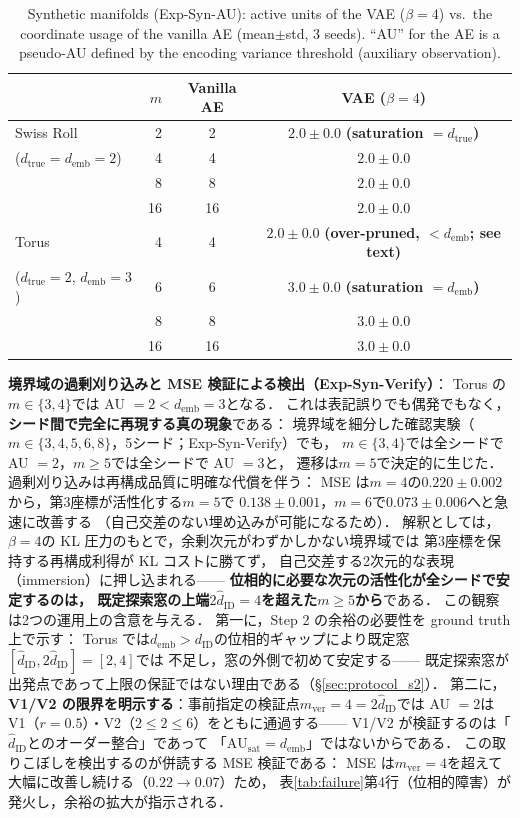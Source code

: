 \documentclass[11pt,a4paper]{jsarticle}
\newcommand{\dID}{d_{\mathrm{ID}}}
\newcommand{\hatdID}{\hat{d}_{\mathrm{ID}}}
\newcommand{\dtrue}{d_{\mathrm{true}}}
\newcommand{\AUsat}{\mathrm{AU}_{\mathrm{sat}}}
\newcommand{\demb}{d_{\mathrm{emb}}}
\begin{document}
\begin{table}[H]
\centering
\caption{Synthetic manifolds (Exp-Syn-AU): active units of the VAE
($\beta = 4$) vs.\ the coordinate usage of the vanilla AE
(mean$\pm$std, 3 seeds). ``AU'' for the AE is a pseudo-AU defined by the
encoding variance threshold (auxiliary observation).}
\label{tab:ea}
\small
\begin{tabular}{lrcc}
\toprule
 & $m$ & Vanilla AE & VAE ($\beta = 4$) \\
\midrule
Swiss Roll & 2 & 2 & $2.0 \pm 0.0$ \textbf{(saturation $= \dtrue$)} \\
($\dtrue = \demb = 2$) & 4 & 4 & $2.0 \pm 0.0$ \\
 & 8 & 8 & $2.0 \pm 0.0$ \\
 & 16 & 16 & $2.0 \pm 0.0$ \\
\midrule
Torus & 4 & 4 & $2.0 \pm 0.0$ \textbf{(over-pruned, $< \demb$; see text)} \\
($\dtrue = 2$, $\demb = 3$) & 6 & 6 & $3.0 \pm 0.0$ \textbf{(saturation $= \demb$)} \\
 & 8 & 8 & $3.0 \pm 0.0$ \\
 & 16 & 16 & $3.0 \pm 0.0$ \\
\bottomrule
\end{tabular}
\end{table}

\textbf{境界域の過剰刈り込みと MSE 検証による検出（Exp-Syn-Verify）}：
Torus の$m \in \{3, 4\}$では AU $= 2 < \demb = 3$となる．
これは表記誤りでも偶発でもなく，\textbf{シード間で完全に再現する真の現象}である：
境界域を細分した確認実験（$m \in \{3, 4, 5, 6, 8\}$，5シード；Exp-Syn-Verify）でも，
$m \in \{3, 4\}$では全シードで AU $= 2$，$m \geq 5$では全シードで AU $= 3$と，
遷移は$m = 5$で決定的に生じた．
過剰刈り込みは再構成品質に明確な代償を伴う：
MSE は$m = 4$の$0.220 \pm 0.002$から，第3座標が活性化する$m = 5$で
$0.138 \pm 0.001$，$m = 6$で$0.073 \pm 0.006$へと急速に改善する
（自己交差のない埋め込みが可能になるため）．
解釈としては，$\beta = 4$の KL 圧力のもとで，余剰次元がわずかしかない境界域では
第3座標を保持する再構成利得が KL コストに勝てず，
自己交差する2次元的な表現（immersion）に押し込まれる——
\textbf{位相的に必要な次元の活性化が全シードで安定するのは，
既定探索窓の上端$2\hatdID = 4$を超えた$m \geq 5$から}である．
この観察は2つの運用上の含意を与える．
第一に，Step 2 の余裕の必要性を ground truth 上で示す：
Torus では$\demb > \dID$の位相的ギャップにより既定窓$[\hatdID, 2\hatdID] = [2, 4]$では
不足し，窓の外側で初めて安定する——
既定探索窓が出発点であって上限の保証ではない理由である（§\ref{sec:protocol_s2}）．
第二に，\textbf{V1/V2 の限界を明示する}：事前指定の検証点$m_{\mathrm{ver}} = 4 = 2\hatdID$では
AU $= 2$は V1（$r = 0.5$）・V2（$2 \leq 2 \leq 6$）をともに通過する——
V1/V2 が検証するのは「$\hatdID$とのオーダー整合」であって
「$\AUsat = \demb$」ではないからである．
この取りこぼしを検出するのが併読する MSE 検証である：
MSE は$m_{\mathrm{ver}} = 4$を超えて大幅に改善し続ける（$0.22 \to 0.07$）ため，
表\ref{tab:failure}第4行（位相的障害）が発火し，余裕の拡大が指示される．
\end{document}
